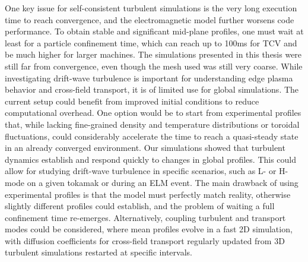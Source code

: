 \vspace{3cm}

One key issue for self-consistent turbulent simulations is the very long execution time to reach convergence, and the electromagnetic model further worsens code performance. To obtain stable and significant mid-plane profiles, one must wait at least for a particle confinement time, which can reach up to 100ms for TCV and be much higher for larger machines. The simulations presented in this thesis were still far from convergence, even though the mesh used was still very coarse. While investigating drift-wave turbulence is important for understanding edge plasma behavior and cross-field transport, it is of limited use for global simulations. The current setup could benefit from improved initial conditions to reduce computational overhead. One option would be to start from experimental profiles that, while lacking fine-grained density and temperature distributions or toroidal fluctuations, could considerably accelerate the time to reach a quasi-steady state in an already converged environment. Our simulations showed that turbulent dynamics establish and respond quickly to changes in global profiles. This could allow for studying drift-wave turbulence in specific scenarios, such as L- or H-mode on a given tokamak or during an ELM event. The main drawback of using experimental profiles is that the model must perfectly match reality, otherwise slightly different profiles could establish, and the problem of waiting a full confinement time re-emerges. Alternatively, coupling turbulent and transport modes could be considered, where mean profiles evolve in a fast 2D simulation, with diffusion coefficients for cross-field transport regularly updated from 3D turbulent simulations restarted at specific intervals.

